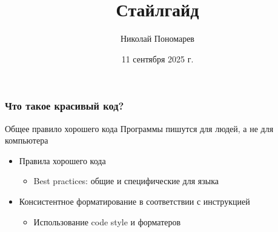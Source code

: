 \documentclass[aspectratio=169]{beamer}
\title{Стайлгайд}
\author{Николай Пономарев}
\date{11 сентября 2025 г.}
\begin{document}
\begin{frame}
    \titlepage
\end{frame}

\begin{frame}
    \frametitle{Что такое красивый код?}

    \begin{exampleblock}{Общее правило хорошего кода}
        Программы пишутся для людей, а не для компьютера
    \end{exampleblock}

    \vspace{1em}

    \begin{itemize}
        \item Правила хорошего кода
              \begin{itemize}
                  \item Best practices: общие и специфические для языка
              \end{itemize}
        \item Консистентное форматирование в соответствии с инструкцией
              \begin{itemize}
                  \item Использование code style и форматеров
              \end{itemize}
    \end{itemize}

\end{frame}
\end{document}
